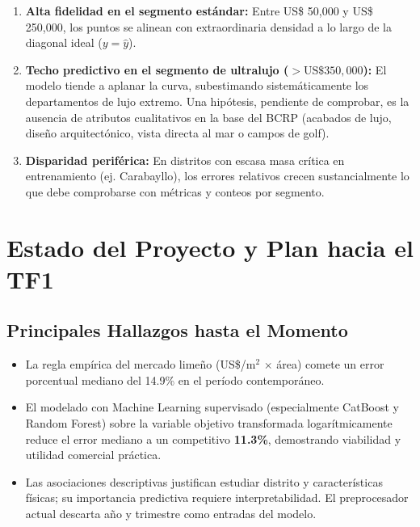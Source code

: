 \documentclass[11pt,a4paper]{article}
\begin{document}
\begin{enumerate}[leftmargin=1.5cm]
    \item \textbf{Alta fidelidad en el segmento estándar:} Entre US\$ 50,000 y US\$ 250,000, los puntos se alinean con extraordinaria densidad a lo largo de la diagonal ideal ($y = \widehat{y}$).
    \item \textbf{Techo predictivo en el segmento de ultralujo ($> \text{US\$} 350,000$):} El modelo tiende a aplanar la curva, subestimando sistemáticamente los departamentos de lujo extremo. Una hipótesis, pendiente de comprobar, es la ausencia de atributos cualitativos en la base del BCRP (acabados de lujo, diseño arquitectónico, vista directa al mar o campos de golf).
    \item \textbf{Disparidad periférica:} En distritos con escasa masa crítica en entrenamiento (ej. Carabayllo), los errores relativos crecen sustancialmente lo que debe comprobarse con métricas y conteos por segmento.
\end{enumerate}

\section{Estado del Proyecto y Plan hacia el TF1}

\subsection{Principales Hallazgos hasta el Momento}
\begin{itemize}[leftmargin=1.5cm]
    \item La regla empírica del mercado limeño (US\$/m$^2$ $\times$ área) comete un error porcentual mediano del 14.9\% en el período contemporáneo.
    \item El modelado con Machine Learning supervisado (especialmente CatBoost y Random Forest) sobre la variable objetivo transformada logarítmicamente reduce el error mediano a un competitivo \textbf{11.3\%}, demostrando viabilidad y utilidad comercial práctica.
    \item Las asociaciones descriptivas justifican estudiar distrito y características físicas; su importancia predictiva requiere interpretabilidad. El preprocesador actual descarta año y trimestre como entradas del modelo.
\end{itemize}
\end{document}
